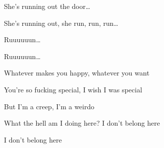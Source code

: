 \begin{song}
She's running out the door… \par
{}She's running out, she run, run, run… \par
Ruuuuuun… \par
{}Ruuuuuun… \par

\bigskip

 \par
Whatever makes you happy, whatever you want \par
You're so fucking special, I wish I was special \par

\bigskip

But I'm a creep, I'm a weirdo \par
What the hell am I doing here? I don't belong here \par
I don't belong here \par

\end{song}
